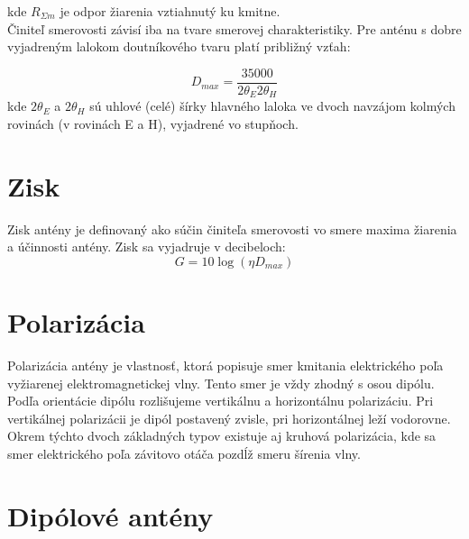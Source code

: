 kde $R_{\Sigma m}$ je odpor žiarenia vztiahnutý ku kmitne.\\\medskip
Činiteľ smerovosti závisí iba na tvare smerovej charakteristiky. Pre anténu s dobre vyjadreným lalokom doutníkového tvaru platí približný vzťah:

\begin{equation}
	D_{max} = \frac{35000}{2\theta_E 2\theta_H}
\end{equation}
kde $2\theta_E $ a $2\theta_H$ sú uhlové (celé) šírky hlavného laloka ve dvoch navzájom kolmých
rovinách (v rovinách E a H), vyjadrené vo stupňoch.

\section{Zisk}
Zisk antény je definovaný ako súčin činiteľa smerovosti vo smere maxima žiarenia a účinnosti antény. Zisk sa vyjadruje v decibeloch:
\begin{equation}
	G = 10 \log(\eta D_{max})
\end{equation}

\section{Polarizácia}

Polarizácia antény je vlastnosť, ktorá popisuje smer kmitania elektrického poľa vyžiarenej elektromagnetickej vlny. Tento smer je vždy zhodný s osou dipólu. \\
\medskip
Podľa orientácie dipólu rozlišujeme vertikálnu a horizontálnu polarizáciu. Pri vertikálnej polarizácii je dipól postavený zvisle, pri horizontálnej leží vodorovne. Okrem týchto dvoch základných typov existuje aj kruhová polarizácia, kde sa smer elektrického poľa závitovo otáča pozdĺž smeru šírenia vlny.

\newpage
\section{Dipólové antény}

